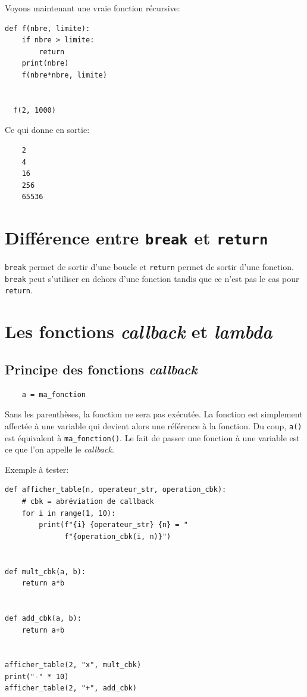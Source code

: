 \documentclass[a4paper,11pt]{book}
\begin{document}
Voyons maintenant une vraie fonction récursive:
\begin{lstlisting}[caption=Fonction récursive]
  def f(nbre, limite):
    if nbre > limite:
        return
    print(nbre)
    f(nbre*nbre, limite)
  
  
  f(2, 1000)
\end{lstlisting}
\medskip

Ce qui donne en sortie:
\begin{verbatim}
    2
    4
    16
    256
    65536
\end{verbatim}
\medskip

\section{Différence entre \texttt{break} et \texttt{return}}
\texttt{break} permet de sortir d'une boucle et \texttt{return} permet de sortir d'une fonction. \texttt{break} peut s'utiliser en dehors d'une fonction tandis que ce n'est pas le cas pour \texttt{return}.
\medskip

\section{Les fonctions \textit{callback} et \textit{lambda}}
\subsection*{Principe des fonctions \textit{callback}}
\begin{verbatim}
    a = ma_fonction
\end{verbatim}
\medskip

Sans les parenthèses, la fonction ne sera pas exécutée. La fonction est simplement affectée à une variable qui devient alors une référence à la fonction. Du coup, \verb|a()| est équivalent à \verb|ma_fonction()|. Le fait de passer une fonction à une variable est ce que l'on appelle le \textit{callback}.
\medskip

Exemple à tester:
\begin{lstlisting}[caption=Le \textit{callback}]
def afficher_table(n, operateur_str, operation_cbk):  
    # cbk = abréviation de callback
    for i in range(1, 10):
        print(f"{i} {operateur_str} {n} = "
              f"{operation_cbk(i, n)}")
  
  
def mult_cbk(a, b):
    return a*b


def add_cbk(a, b):
    return a+b


afficher_table(2, "x", mult_cbk)
print("-" * 10)
afficher_table(2, "+", add_cbk)
\end{lstlisting}
\medskip
\end{document}
